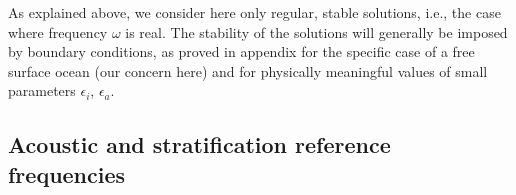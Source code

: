 \documentclass[a4paper,11pt]{article}
\begin{document}
As explained above, we consider here only regular, stable solutions, i.e., the case where frequency $\omega$ is real. The stability of the solutions will generally be imposed by boundary conditions, as proved in appendix  for the specific case of a free surface ocean (our concern here) and for physically meaningful values of small parameters $\epsilon_i$, $\epsilon_a$.



\subsection{Acoustic and stratification reference frequencies}
\label{SubSectionFactoDisp}

\end{document}
